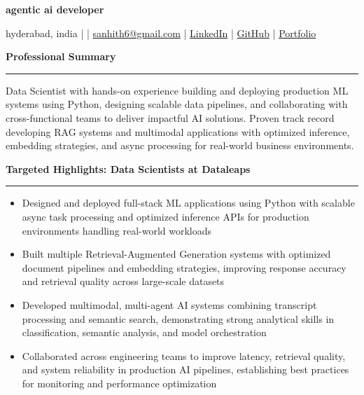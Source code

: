 \documentclass[9pt, letterpaper]{article}
\newcommand{\name}[1]{%
    \begin{center}
        {\LARGE \textbf{#1}}
    \end{center}
}
\newcommand{\sectionheading}[1]{%
    \vspace{4pt}%
    {\large \textbf{#1}}%
    \vspace{1pt}%
    \hrule
    \vspace{2pt}%
}
\begin{document}
\name{agentic ai developer}
\begin{center}
    hyderabad, india \quad |  \quad | \quad
    \href{mailto:sanhith6@gmail.com}{sanhith6@gmail.com} \quad | \quad
    \href{https://www.linkedin.com/in/sanhith-reddy-740a1625b/}{LinkedIn} \quad | \quad
    \href{https://github.com/tsanhith}{GitHub} \quad | \quad
    \href{https://johndoe.dev}{Portfolio}
\end{center}

\vspace{0pt}

\sectionheading{Professional Summary}
Data Scientist with hands-on experience building and deploying production ML systems using Python, designing scalable data pipelines, and collaborating with cross-functional teams to deliver impactful AI solutions. Proven track record developing RAG systems and multimodal applications with optimized inference, embedding strategies, and async processing for real-world business environments.

\sectionheading{Targeted Highlights: Data Scientists at Dataleaps}
\begin{itemize}[leftmargin=0.25in, itemindent=-0.15in, label={--}]
    \item Designed and deployed full-stack ML applications using Python with scalable async task processing and optimized inference APIs for production environments handling real-world workloads
    \item Built multiple Retrieval-Augmented Generation systems with optimized document pipelines and embedding strategies, improving response accuracy and retrieval quality across large-scale datasets
    \item Developed multimodal, multi-agent AI systems combining transcript processing and semantic search, demonstrating strong analytical skills in classification, semantic analysis, and model orchestration
    \item Collaborated across engineering teams to improve latency, retrieval quality, and system reliability in production AI pipelines, establishing best practices for monitoring and performance optimization
\end{itemize}
\end{document}
